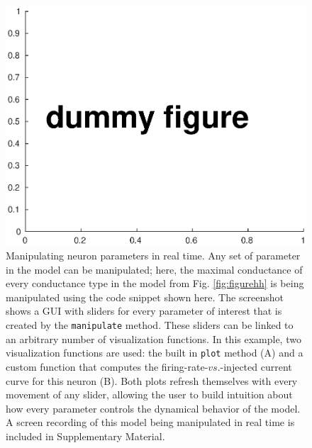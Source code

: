 \documentclass{frontiersSCNS} %
\begin{document}
\begin{figure}
	\centering
	\includegraphics[width=1.0\linewidth]{gfx/figure_manipulate}
	\caption{Manipulating neuron parameters in real time. Any set of parameter in the model can be manipulated; here, the maximal conductance of every conductance type in the model from Fig. \ref{fig:figurehh} is being manipulated using the code snippet shown here. The screenshot shows a GUI with sliders for every parameter of interest that is created by the \texttt{manipulate} method. These sliders can be linked to an arbitrary number of visualization functions. In this example, two visualization functions are used: the built in \texttt{plot} method (A) and a custom function that computes the firing-rate-$vs$.-injected current curve for this neuron (B). Both plots refresh themselves with every movement of any slider, allowing the user to build intuition about how every parameter controls the dynamical behavior of the model. A screen recording of this model being manipulated in real time is included in Supplementary Material.}
	\label{fig:figuremanipulate}
\end{figure}

\clearpage
\end{document}
